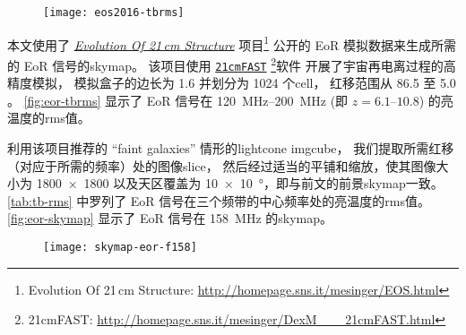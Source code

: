 \begin{figure}[htp]
  \centering
  \texttt{[image: eos2016-tbrms]}
  \label{fig:eor-tbrms}
\end{figure}

本文使用了
\href{http://homepage.sns.it/mesinger/EOS.html}{\textit{Evolution Of 21\,cm Structure}}
项目\footnote{%
  Evolution Of 21\,cm Structure:
  \url{http://homepage.sns.it/mesinger/EOS.html}
} 公开的 EoR 模拟数据来生成所需的 EoR 信号的\ac{skymap}。
该项目使用
\href{http://homepage.sns.it/mesinger/DexM___21cmFAST.html}{\texttt{21cmFAST}}%
\footnote{%
  21cmFAST: \url{http://homepage.sns.it/mesinger/DexM___21cmFAST.html}
}软件\cite{mesinger2011}
开展了宇宙再电离过程的高精度模拟，
模拟盒子的边长为 \SI{1.6}{\Gpc} 并划分为 1024 个\ac{cell}，
红移范围从 86.5 至 5.0 \cite{mesinger2016}。
\autoref{fig:eor-tbrms} 显示了 EoR 信号在 \SIrange{120}{200}{\MHz}
(即 $z = \numrange{6.1}{10.8}$) 的亮温度的\acs*{rms}值。

利用该项目推荐的 \enquote{faint galaxies} 情形的\ac{lightcone} \ac{imgcube}，
我们提取所需红移（对应于所需的频率）处的图像\ac{slice}，
然后经过适当的平铺和缩放，使其图像大小为 \num{1800 x 1800}
以及天区覆盖为 \SI{10 x 10}{\degree}，即与前文的前景\ac{skymap}一致。
\autoref{tab:tb-rms} 中罗列了 EoR 信号在三个频带的中心频率处的亮温度的\ac{rms}值。
\autoref{fig:eor-skymap} 显示了 EoR 信号在 \SI{158}{\MHz} 的\ac{skymap}。

\begin{figure}[htp]
  \centering
  \texttt{[image: skymap-eor-f158]}
  \label{fig:eor-skymap}
\end{figure}


